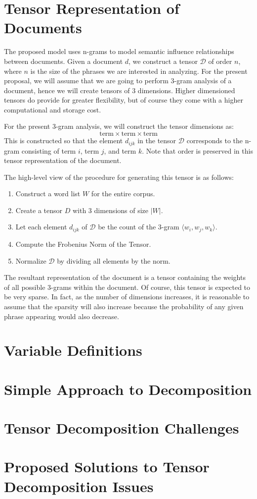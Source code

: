 \documentclass{report}
\newcommand{\tens}[1]{\mathcal{#1}}
\begin{document}
\section{Tensor Representation of Documents}
The proposed model uses n-grams to model semantic influence relationships
between documents.  Given a document $d$, we construct a tensor $\tens{D}$
of order $n$, where $n$ is the size of the phrases we are interested
in analyzing.  For the present proposal, we will assume that we are going
to perform 3-gram analysis of a document, hence we will create tensors
of 3 dimensions.  Higher dimensioned tensors do provide for greater 
flexibility, but of course they come with a higher computational and 
storage cost.

For the present 3-gram analysis, we will construct the tensor dimensions
as:
$$\mathrm{term} \times \mathrm{term} \times \mathrm{term}$$
This is constructed so that the element $d_{ijk}$ in the tensor $\tens{D}$
corresponds to the n-gram consisting of term $i$, term $j$, and term $k$.  
Note that order is preserved in this tensor representation of the document.

The high-level view of the procedure for generating this tensor is as follows:
\begin{enumerate}
\item Construct a word list $W$ for the entire corpus.
\item Create a tensor $D$ with 3 dimensions of size $|W|$. 
\item Let each element $d_{ijk}$ of $\tens{D}$ be the count of the 3-gram $\langle w_i, w_j, w_k \rangle$.
\item Compute the Frobenius Norm of the Tensor.
\item Normalize $\tens{D}$ by dividing all elements by the norm.
\end{enumerate}

The resultant representation of the document is a tensor containing the
weights of all possible 3-grams within the document.  Of course, this
tensor is expected to be very sparse.  In fact, as the number of 
dimensions increases, it is reasonable to assume that the sparsity will
also increase because the probability of any given phrase appearing would
also decrease.  

\section{Variable Definitions}

\section{Simple Approach to Decomposition}

\section{Tensor Decomposition Challenges}

\section{Proposed Solutions to Tensor Decomposition Issues}
\end{document}
